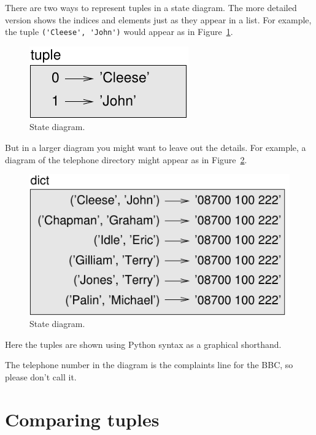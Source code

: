 \documentclass[10pt]{book}
\begin{document}
There are two ways to represent tuples in a state diagram.  The more
detailed version shows the indices and elements just as they appear in
a list.  For example, the tuple \verb"('Cleese', 'John')" would appear
as in Figure~\ref{fig.tuple1}.

\begin{figure}
\centerline
{\includegraphics[scale=0.8]{figs/tuple1.pdf}}
\caption{State diagram.}
\label{fig.tuple1}
\end{figure}

But in a larger diagram you might want to leave out the
details.  For example, a diagram of the telephone directory might
appear as in Figure~\ref{fig.dict2}.

\begin{figure}
\centerline
{\includegraphics[scale=0.8]{figs/dict2.pdf}}
\caption{State diagram.}
\label{fig.dict2}
\end{figure}

Here the tuples are shown using Python syntax as a graphical
shorthand.

The telephone number in the diagram is the complaints line for the
BBC, so please don't call it.



\section{Comparing tuples}
\end{document}
